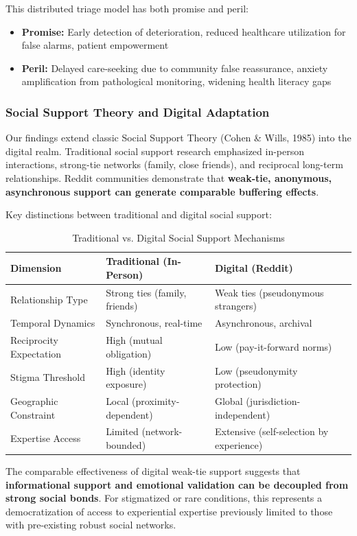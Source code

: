\documentclass[12pt, a4paper]{article}
\begin{document}
This distributed triage model has both promise and peril:
\begin{itemize}
    \item \textbf{Promise:} Early detection of deterioration, reduced healthcare utilization for false alarms, patient empowerment
    \item \textbf{Peril:} Delayed care-seeking due to community false reassurance, anxiety amplification from pathological monitoring, widening health literacy gaps
\end{itemize}

\subsubsection{Social Support Theory and Digital Adaptation}
Our findings extend classic Social Support Theory (Cohen \& Wills, 1985) into the digital realm. Traditional social support research emphasized in-person interactions, strong-tie networks (family, close friends), and reciprocal long-term relationships. Reddit communities demonstrate that \textbf{weak-tie, anonymous, asynchronous support can generate comparable buffering effects}.

Key distinctions between traditional and digital social support:
\begin{table}[H]
\centering
\caption{Traditional vs. Digital Social Support Mechanisms}
\label{tab:support}
\begin{tabular}{p{4cm}p{5cm}p{5cm}}
\toprule
\textbf{Dimension} & \textbf{Traditional (In-Person)} & \textbf{Digital (Reddit)} \\
\midrule
Relationship Type & Strong ties (family, friends) & Weak ties (pseudonymous strangers) \\
Temporal Dynamics & Synchronous, real-time & Asynchronous, archival \\
Reciprocity Expectation & High (mutual obligation) & Low (pay-it-forward norms) \\
Stigma Threshold & High (identity exposure) & Low (pseudonymity protection) \\
Geographic Constraint & Local (proximity-dependent) & Global (jurisdiction-independent) \\
Expertise Access & Limited (network-bounded) & Extensive (self-selection by experience) \\
\bottomrule
\end{tabular}
\end{table}

The comparable effectiveness of digital weak-tie support suggests that \textbf{informational support and emotional validation can be decoupled from strong social bonds}. For stigmatized or rare conditions, this represents a democratization of access to experiential expertise previously limited to those with pre-existing robust social networks.
\end{document}
